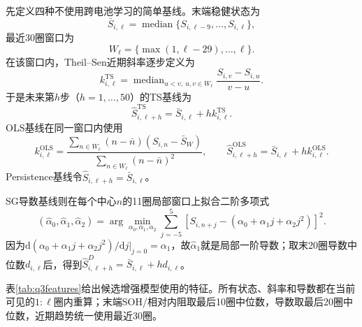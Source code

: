 \documentclass[withoutpreface]{cumcmthesis}
\newcommand{\TS}{\mathrm{TS}}
\begin{document}
先定义四种不使用跨电池学习的简单基线。末端稳健状态为
\begin{equation}
\bar S_{i,\ell}=\operatorname{median}
\{S_{i,\ell-9},\ldots,S_{i,\ell}\},
\end{equation}
最近30圈窗口为
\begin{equation}
W_{\ell}=\{\max(1,\ell-29),\ldots,\ell\}.
\end{equation}
在该窗口内，Theil--Sen近期斜率逐步定义为
\begin{equation}
k_{i,\ell}^{\TS}
=\operatorname{median}_{u<v,\ u,v\in W_{\ell}}
\frac{S_{i,v}-S_{i,u}}{v-u}.
\end{equation}
于是未来第$h$步（$h=1,\ldots,50$）的TS基线为
\begin{equation}
\widehat S_{i,\ell+h}^{\TS}
=\bar S_{i,\ell}+h k_{i,\ell}^{\TS}.
\label{eq:tsbaseline}
\end{equation}
OLS基线在同一窗口内使用
\begin{equation}
k_{i,\ell}^{\mathrm{OLS}}
=\frac{\sum_{n\in W_{\ell}}(n-\bar n)(S_{i,n}-\bar S_W)}
{\sum_{n\in W_{\ell}}(n-\bar n)^2},
\qquad
\widehat S_{i,\ell+h}^{\mathrm{OLS}}
=\bar S_{i,\ell}+h k_{i,\ell}^{\mathrm{OLS}}.
\end{equation}
Persistence基线令$\widehat S_{i,\ell+h}=\bar S_{i,\ell}$。

SG导数基线则在每个中心$n$的11圈局部窗口上拟合二阶多项式
\begin{equation}
(\widehat\alpha_0,\widehat\alpha_1,\widehat\alpha_2)
=\arg\min_{\alpha_0,\alpha_1,\alpha_2}
\sum_{j=-5}^{5}\left[S_{i,n+j}-(\alpha_0+\alpha_1j+\alpha_2j^2)\right]^2.
\end{equation}
因为$\mathrm d(\alpha_0+\alpha_1j+\alpha_2j^2)/\mathrm dj|_{j=0}=\alpha_1$，故$\widehat\alpha_1$就是局部一阶导数；取末20圈导数中位数$d_{i,\ell}$后，得到$\widehat S_{i,\ell+h}^{D}=\bar S_{i,\ell}+hd_{i,\ell}$。

表\ref{tab:q3features}给出候选增强模型使用的特征。所有状态、斜率和导数都在当前可见的$1{:}\ell$圈内重算；末端SOH/相对内阻取最后10圈中位数，导数取最后20圈中位数，近期趋势统一使用最近30圈。
\end{document}
